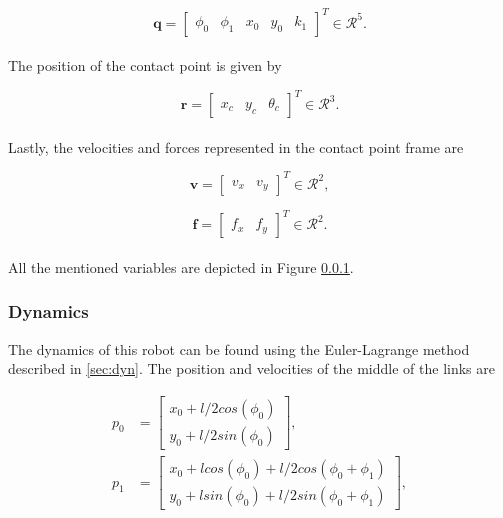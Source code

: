 \begin{equation}
    \mathbf{q} =
    \begin{bmatrix}
        \phi_0 & \phi_1 & x_0 & y_0 & k_1
    \end{bmatrix}^T \in \mathcal{R}^5.
\end{equation}
\\
The position of the contact point is given by

\begin{equation}
    \mathbf{r} = 
    \begin{bmatrix}
        x_c & y_c & \theta_c
    \end{bmatrix}^T \in \mathcal{R}^3.
\end{equation}
\\

Lastly, the velocities and forces represented in the contact point frame are 

\begin{equation}
    \mathbf{v} =
    \begin{bmatrix}
        v_x & v_y
    \end{bmatrix}^T \in \mathcal{R}^2,
\end{equation}

\begin{equation}
    \mathbf{f} =
    \begin{bmatrix}
        f_x & f_y
    \end{bmatrix}^T \in \mathcal{R}^2.
\end{equation}
\\
All the mentioned variables are depicted in Figure \ref{}.

\subsubsection{Dynamics}

The dynamics of this robot can be found using the Euler-Lagrange method described in \ref{sec:dyn}.
The position and velocities of the middle of the links are

\begin{equation}
    \begin{split}
        p_0 &=
        \begin{bmatrix}
            x_0 + l/2 cos(\phi_0)\\
            y_0 + l/2 sin(\phi_0)
        \end{bmatrix}, \\
        p_1 &=
        \begin{bmatrix}
            x_0 + l cos(\phi_0) + l/2 cos(\phi_0+ \phi_1)\\
            y_0 + l sin(\phi_0) + l/2 sin(\phi_0+\phi_1)
        \end{bmatrix},
    \end{split}
\end{equation}

